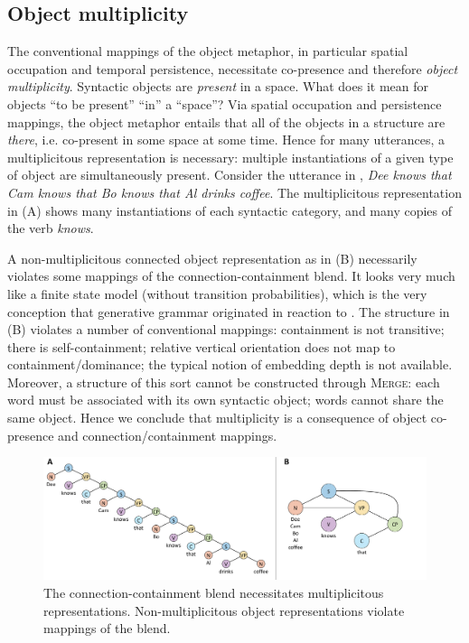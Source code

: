 \subsection{Object multiplicity}

The conventional mappings of the object metaphor, in particular spatial occupation and temporal persistence, necessitate co-presence and therefore \textit{object multiplicity}. Syntactic objects are \textit{present} in a space. What does it mean for objects “to be present” “in” a “space”? Via spatial occupation and persistence mappings, the object metaphor entails that all of the objects in a structure are \textit{there}, i.e. co-present in some space at some time. Hence for many utterances, a multiplicitous representation is necessary: multiple instantiations of a given type of object are simultaneously present. Consider the utterance in {}, \textit{Dee knows that Cam knows that Bo knows that Al drinks coffee}. The multiplicitous representation in (A) shows many instantiations of each syntactic category, and many copies of the verb \textit{knows}.

  A non-multiplicitous connected object representation as in (B) necessarily violates some mappings of the connection-containment blend. It looks very much like a finite state model (without transition probabilities), which is the very conception that generative grammar originated in reaction to \citep{Chomsky1956}. The structure in (B) violates a number of conventional mappings: containment is not transitive; there is self-containment; relative vertical orientation does not map to containment/dominance; the typical notion of embedding depth is not available. Moreover, a structure of this sort cannot be constructed through \textsc{Merge}: each word must be associated with its own syntactic object; words cannot share the same object. Hence we conclude that multiplicity is a consequence of object co-presence and connection/containment mappings.

  
\begin{figure}
\includegraphics[width=\textwidth]{figures/Tilsen-img36.png}
\caption{The connection-containment blend necessitates multiplicitous representations. Non-multiplicitous object representations violate mappings of the blend.}
\label{fig:3:8}
\end{figure}
 

